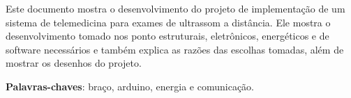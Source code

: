 \begin{resumo}
Este documento mostra o desenvolvimento do projeto de implementação de um sistema de telemedicina para exames de ultrassom a distância. Ele mostra o desenvolvimento tomado nos ponto estruturais, eletrônicos, energéticos e de software necessários e também explica as razões das escolhas tomadas, além de mostrar os desenhos do projeto.

 \vspace{\onelineskip}
    
 \noindent
 \textbf{Palavras-chaves}: braço, arduino, energia e comunicação.
\end{resumo}
